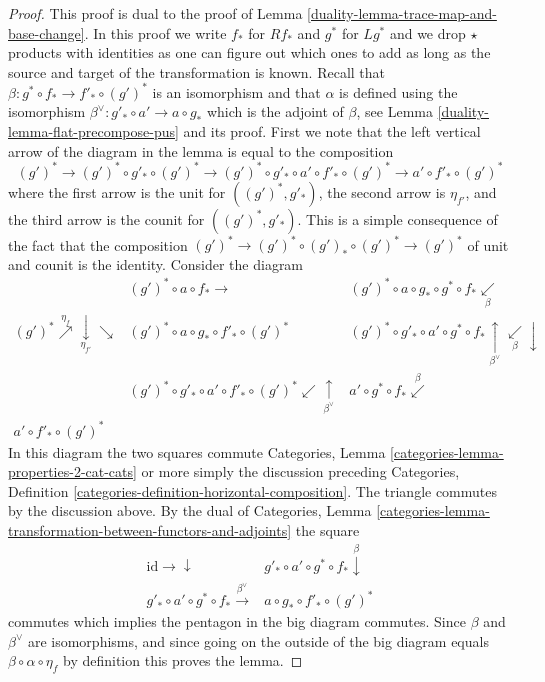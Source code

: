 \begin{proof}

This proof is dual to the proof of Lemma \ref{duality-lemma-trace-map-and-base-change}.
In this proof we write $f_*$ for $Rf_*$ and $g^*$ for $Lg^*$ and we
drop $\star$ products with identities as one can figure out which ones
to add as long as the source and target of the transformation is known.
Recall that $\beta : g^* \circ f_* \to f'_* \circ (g')^*$ is an isomorphism
and that $\alpha$ is defined using
the isomorphism $\beta^\vee : g'_* \circ a' \to a \circ g_*$
which is the adjoint of $\beta$, see Lemma \ref{duality-lemma-flat-precompose-pus}
and its proof. First we note that the left vertical arrow
of the diagram in the lemma is equal to the composition
$$
(g')^* \to (g')^* \circ g'_* \circ (g')^* \to
(g')^* \circ g'_* \circ a' \circ f'_* \circ (g')^* \to
a' \circ f'_* \circ (g')^*
$$
where the first arrow is the unit for $((g')^*, g'_*)$, the second arrow
is $\eta_{f'}$, and the third arrow is the counit for $((g')^*, g'_*)$.
This is a simple consequence of the fact that the composition
$(g')^* \to (g')^* \circ (g')_* \circ (g')^* \to (g')^*$
of unit and counit is the identity. Consider the diagram
$$
\begin{array}{ccc} & (g')^* \circ a \circ f_* \longrightarrow & (g')^* \circ a \circ g_* \circ g^* \circ f_*
\underset{\beta}{\swarrow} \\ (g')^* \overset{\eta_f}{\nearrow}\underset{\eta_{f'}}{\downarrow}\searrow & (g')^* \circ a \circ g_* \circ f'_* \circ (g')^* & (g')^* \circ g'_* \circ a' \circ g^* \circ f_*
\underset{\beta^\vee}{\uparrow}\underset{\beta}{\swarrow}\downarrow \\  & (g')^* \circ g'_* \circ a' \circ f'_* \circ (g')^*
\swarrow\underset{\beta^\vee}{\uparrow} & a' \circ g^* \circ f_* \overset{\beta}{\swarrow} \\ a' \circ f'_* \circ (g')^* &  & \end{array}
$$
In this diagram the two squares commute
Categories, Lemma \ref{categories-lemma-properties-2-cat-cats}
or more simply the discussion preceding
Categories, Definition \ref{categories-definition-horizontal-composition}.
The triangle commutes by the discussion above. By the dual of
Categories, Lemma
\ref{categories-lemma-transformation-between-functors-and-adjoints}
the square
$$
\begin{array}{cc}\text{id} \longrightarrow\downarrow & g'_* \circ a' \circ g^* \circ f_* \overset{\beta}{\downarrow} \\ g'_* \circ a' \circ g^* \circ f_* \overset{\beta^\vee}{\longrightarrow} & a \circ g_* \circ f'_* \circ (g')^*\end{array}
$$
commutes which implies the pentagon in the big diagram commutes.
Since $\beta$ and $\beta^\vee$ are isomorphisms, and since going on
the outside of the big diagram equals
$\beta \circ \alpha \circ \eta_f$ by definition this proves the lemma.
\end{proof}

